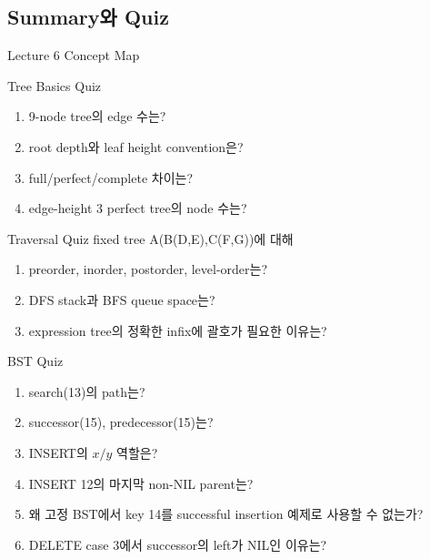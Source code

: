 \subsection{Summary와 Quiz}
\begin{frame}{Lecture 6 Concept Map}
\centering{}
\end{frame}
\begin{frame}{Tree Basics Quiz}
\begin{enumerate}\item 9-node tree의 edge 수는?\item root depth와 leaf height convention은?\item full/perfect/complete 차이는?\item edge-height 3 perfect tree의 node 수는?\end{enumerate}
\end{frame}
\begin{frame}{Traversal Quiz}
fixed tree A(B(D,E),C(F,G))에 대해
\begin{enumerate}\item preorder, inorder, postorder, level-order는?\item DFS stack과 BFS queue space는?\item expression tree의 정확한 infix에 괄호가 필요한 이유는?\end{enumerate}
\end{frame}
\begin{frame}{BST Quiz}
\small\begin{enumerate}
\item search(13)의 path는?
\item successor(15), predecessor(15)는?
\item INSERT의 $x/y$ 역할은?
\item INSERT 12의 마지막 non-NIL parent는?
\item 왜 고정 BST에서 key 14를 successful insertion 예제로 사용할 수 없는가?
\item DELETE case 3에서 successor의 left가 NIL인 이유는?
\end{enumerate}
\end{frame}
